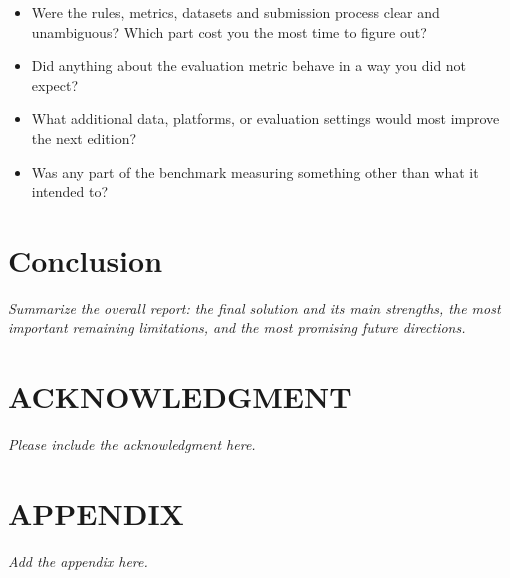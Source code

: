 \documentclass[letterpaper,10pt,conference]{ieeeconf}
\newcommand{\instruction}[1]{\textcolor{instructionblue}{\textit{#1}}}
\begin{document}
\begin{itemize}
    \item Were the rules, metrics, datasets and submission process clear and unambiguous?
    Which part cost you the most time to figure out?
    \item Did anything about the evaluation metric behave in a way you did not expect?
    \item What additional data, platforms, or evaluation settings would most improve the
    next edition?
    \item Was any part of the benchmark measuring something other than what it intended to?
\end{itemize}

\section{Conclusion}
\instruction{Summarize the overall report: the final solution and its main strengths, the
most important remaining limitations, and the most promising future directions.}

\section*{ACKNOWLEDGMENT}
\instruction{Please include the acknowledgment here.}

\section*{APPENDIX}
\instruction{Add the appendix here.}

\end{document}
